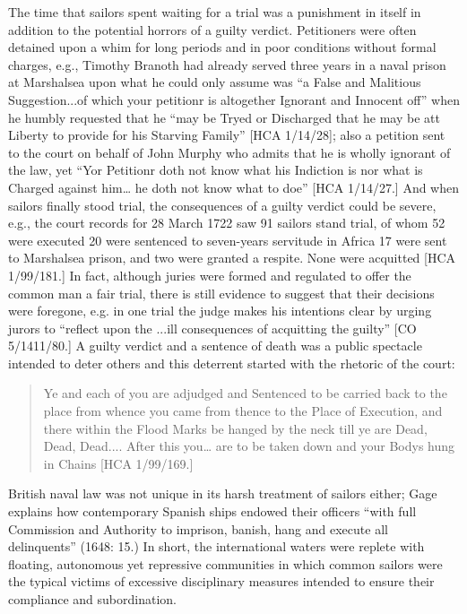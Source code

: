 \begin{styleStandard}
\end{styleStandard}


\begin{styleStandard}
The time that sailors spent waiting for a trial was a punishment in itself in addition to the potential horrors of a guilty verdict. Petitioners were often detained upon a whim for long periods and in poor conditions without formal charges, e.g., Timothy Branoth had already served three years in a naval prison at Marshalsea upon what he could only assume was “a False and Malitious Suggestion...of which your petitionr is altogether Ignorant and Innocent off” when he humbly requested that he “may be Tryed or Discharged that he may be att Liberty to provide for his Starving Family” [HCA 1/14/28]; also a petition sent to the court on behalf of John Murphy who admits that he is wholly ignorant of the law, yet “Yor Petitionr doth not know what his Indiction is nor what is Charged against him… he doth not know what to doe” [HCA 1/14/27.] And when sailors finally stood trial, the consequences of a guilty verdict could be severe, e.g., the court records for 28 March 1722 saw 91 sailors stand trial, of whom 52 were executed 20 were sentenced to seven-years servitude in Africa 17 were sent to Marshalsea prison, and two were granted a respite. None were acquitted [HCA 1/99/181.] In fact, although juries were formed and regulated to offer the common man a fair trial, there is still evidence to suggest that their decisions were foregone, e.g. in one trial the judge makes his intentions clear by urging jurors to “reflect upon the ...ill consequences of acquitting the guilty” [CO 5/1411/80.] A guilty verdict and a sentence of death was a public spectacle intended to deter others and this deterrent started with the rhetoric of the court: 
\end{styleStandard}


\begin{quotation}
Ye and each of you are adjudged and Sentenced to be carried back to the place from whence you came from thence to the Place of Execution, and there within the Flood Marks be hanged by the neck till ye are Dead, Dead, Dead.... After this you… are to be taken down and your Bodys hung in Chains [HCA 1/99/169.] 

\end{quotation}
\begin{styleStandard}
British naval law was not unique in its harsh treatment of sailors either; Gage explains how contemporary Spanish ships endowed their officers “with full Commission and Authority to imprison, banish, hang and execute all delinquents” (1648: 15.) In short, the international waters were replete with floating, autonomous yet repressive communities in which common sailors were the typical victims of excessive disciplinary measures intended to ensure their compliance and subordination. 
\end{styleStandard}


